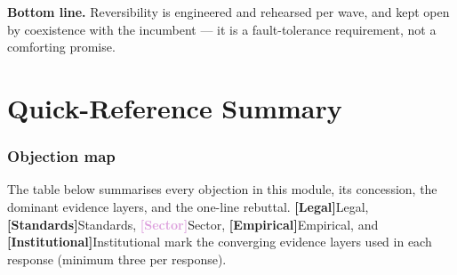 \documentclass[11pt,a4paper,twoside]{book}
\newcommand{\evlegal}{\textcolor{BrickRed}{\textbf{[Legal]}}\space}
\newcommand{\evstd}{\textcolor{NavyBlue}{\textbf{[Standards]}}\space}
\newcommand{\evsector}{\textcolor{Plum}{\textbf{[Sector]}}\space}
\newcommand{\evempirical}{\textcolor{OliveGreen}{\textbf{[Empirical]}}\space}
\newcommand{\evinst}{\textcolor{Slate}{\textbf{[Institutional]}}\space}
\begin{document}
\begin{answerbox}[Response O8.1]
\textbf{Bottom line.} Reversibility is engineered and rehearsed per wave, and
kept open by coexistence with the incumbent --- it is a fault-tolerance
requirement, not a comforting promise.
\end{answerbox}

\part{Quick-Reference Summary}

\section{Objection map}
\label{sec:arg-summary}

The table below summarises every objection in this module, its concession,
the dominant evidence layers, and the one-line rebuttal. \evlegal{}Legal,
\evstd{}Standards, \evsector{}Sector, \evempirical{}Empirical, and
\evinst{}Institutional mark the converging evidence layers used in each
response (minimum three per response).
\end{document}

